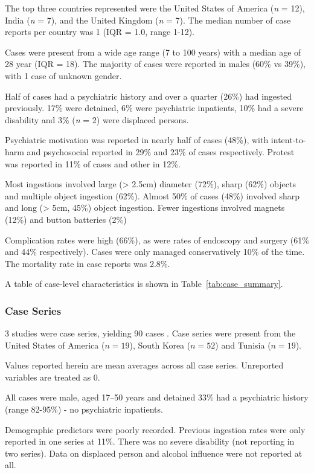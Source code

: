 \documentclass[pdflatex,sn-basic,Numbered]{sn-jnl}
\begin{document}
The top three countries represented were the United States of America (\emph{n} = 12), India (\emph{n} = 7), and the United Kingdom (\emph{n} = 7). The median number of case reports per country was 1 (IQR = 1.0, range 1-12).

Cases were present from a wide age range (7 to 100 years) with a median age of 28 year (IQR = 18). The majority of cases were reported in males (60\% vs 39\%), with 1 case of unknown gender. 

Half of cases had a psychiatric history and over a quarter (26\%) had ingested previously. 17\% were detained, 6\% were psychiatric inpatients, 10\% had a severe disability and 3\% (\emph{n} = 2) were displaced persons.

Psychiatric motivation was reported in nearly half of cases (48\%), with intent-to-harm and psychosocial reported in 29\% and 23\% of cases respectively. Protest was reported in 11\% of cases and other in 12\%.

Most ingestions involved large (\textgreater{} 2.5cm) diameter (72\%), sharp (62\%) objects and multiple object ingestion (62\%). Almost 50\% of cases (48\%) involved sharp and long (\textgreater{} 5cm, 45\%) object ingestion. Fewer ingestions involved magnets (12\%) and button batteries (2\%)

Complication rates were high (66\%), as were rates of endoscopy and surgery (61\% and 44\% respectively). Cases were only managed conservatively 10\% of the time. The mortality rate in case reports was 2.8\%. 

A table of case-level characteristics is shown in Table~\ref{tab:case_summary}. 

\subsubsection*{Case Series}

3 studies were case series, yielding 90 cases \cite{Elghali_2016, Karp_1991b, Lee_2007}. Case series were present from the United States of America \cite{Karp_1991b} ($n = 19$), South Korea \cite{Lee_2007} ($n = 52$) and Tunisia \cite{Elghali_2016} ($n = 19$).

Values reported herein are mean averages across all case series. Unreported variables are treated as 0.

All cases were male, aged 17--50 years and detained 33\% had a psychiatric history (range 82-95\%) - no psychiatric inpatients. 

Demographic predictors were poorly recorded. Previous ingestion rates were only reported in one series at 11\%. There was no severe disability (not reporting in two series). Data on displaced person and alcohol influence were not reported at all.
\end{document}
